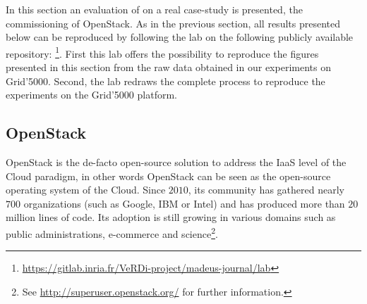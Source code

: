 \graphicspath{{images/}}

In this section an evaluation of \mad on a real case-study is
presented, the commissioning of OpenStack. As in the previous section,
all results presented below can be reproduced by following the lab on
the following publicly available repository:
\footnote{\url{https://gitlab.inria.fr/VeRDi-project/madeus-journal/lab}}. First
this lab offers the possibility to reproduce the figures presented in
this section from the raw data obtained in our experiments on
Grid'5000. Second, the lab redraws the complete process to reproduce
the experiments on the Grid'5000 platform.

\subsection{OpenStack}
\label{subsec:openstack}

OpenStack is the de-facto open-source solution to address the IaaS
level of the Cloud paradigm, in other words OpenStack can be seen as
the open-source operating system of the Cloud. Since $2010$, its
community has gathered nearly $700$ organizations (such as Google, IBM
or Intel) and has produced more than $20$ million lines of code. Its
adoption is still growing in various domains such as public
administrations, e-commerce and science\footnote{See
  \url{http://superuser.openstack.org/} for further information.}.

